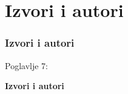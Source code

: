 %

\section{Izvori i autori}
\begin{frame}[fragile]
	\frametitle{Izvori i autori}

	\begin{center}\huge{Poglavlje 7:}\end{center}
	\begin{center}\huge{\color{typo3darkgrey}\textbf{Izvori i autori}}\end{center}

\end{frame}


